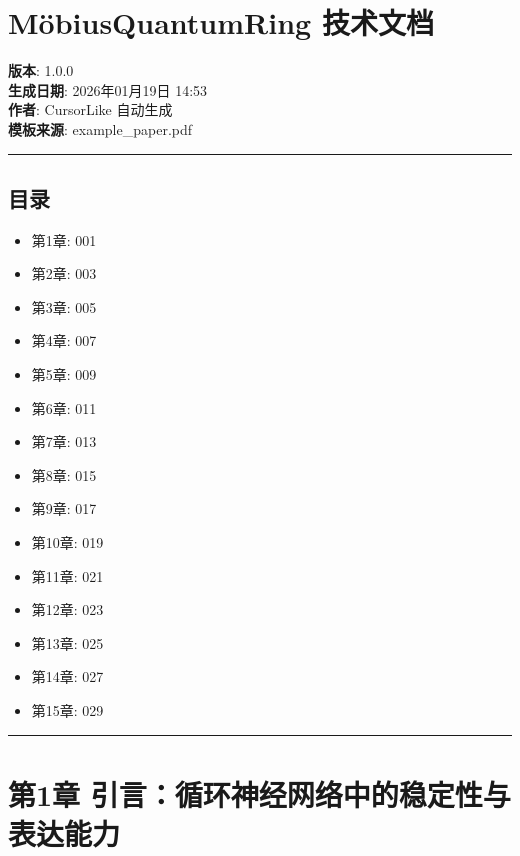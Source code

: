 \documentclass[
  12pt,
]{article}
\author{}
\date{}
\providecommand{\tightlist}{%
  \setlength{\itemsep}{0pt}\setlength{\parskip}{0pt}}
\begin{document}
{
\setcounter{tocdepth}{3}
\tableofcontents
}
\hypertarget{muxf6biusquantumring-ux6280ux672fux6587ux6863}{%
\section{MöbiusQuantumRing
技术文档}\label{muxf6biusquantumring-ux6280ux672fux6587ux6863}}

\textbf{版本}: 1.0.0\\
\textbf{生成日期}: 2026年01月19日 14:53\\
\textbf{作者}: CursorLike 自动生成\\
\textbf{模板来源}: example\_paper.pdf

\begin{center}\rule{0.5\linewidth}{0.5pt}\end{center}

\hypertarget{ux76eeux5f55}{%
\subsection{目录}\label{ux76eeux5f55}}

\begin{itemize}
\tightlist
\item
  第1章: 001
\item
  第2章: 003
\item
  第3章: 005
\item
  第4章: 007
\item
  第5章: 009
\item
  第6章: 011
\item
  第7章: 013
\item
  第8章: 015
\item
  第9章: 017
\item
  第10章: 019
\item
  第11章: 021
\item
  第12章: 023
\item
  第13章: 025
\item
  第14章: 027
\item
  第15章: 029
\end{itemize}

\begin{center}\rule{0.5\linewidth}{0.5pt}\end{center}

\hypertarget{ux7b2c1ux7ae0-ux5f15ux8a00ux5faaux73afux795eux7ecfux7f51ux7edcux4e2dux7684ux7a33ux5b9aux6027ux4e0eux8868ux8fbeux80fdux529b}{%
\section{第1章
引言：循环神经网络中的稳定性与表达能力}\label{ux7b2c1ux7ae0-ux5f15ux8a00ux5faaux73afux795eux7ecfux7f51ux7edcux4e2dux7684ux7a33ux5b9aux6027ux4e0eux8868ux8fbeux80fdux529b}}
\end{document}
